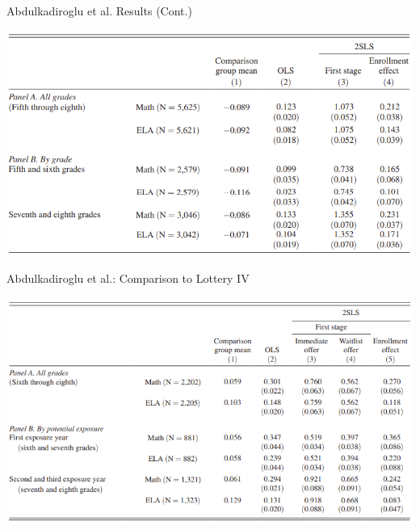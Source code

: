 \documentclass[11pt,english]{beamer}
\begin{document}
\begin{frame}{ Abdulkadiroglu et al. Results (Cont.)}
\begin{center}
	\includegraphics[width=1\textwidth]{figures/charters_table.png}
\end{center}
\end{frame}

\begin{frame}{ Abdulkadiroglu et al.: Comparison to Lottery IV}
\begin{center}
	\includegraphics[width=1\textwidth]{figures/charters_table_2.png}
\end{center}
\end{frame}
\end{document}
